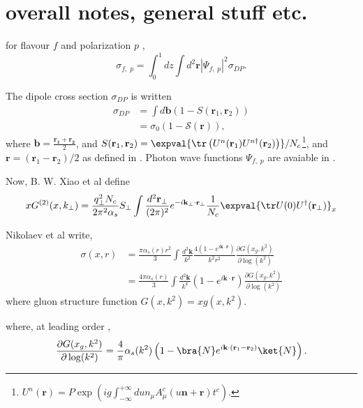 
\section{overall notes, general stuff etc.}

for flavour $f$ and polarization $p$ \cite{cambqcd}\cite{gbw1998},
\begin{equation}
	\sigma_{f,\;p}=\int_{0}^{1} d z \int d^2\mathbf{r}|\Psi_{f,\;p}|^2 \sigma_{DP}.
\end{equation}

The dipole cross section $\sigma_{DP}$ is written \cite{cambqcd}%
\begin{align}
	\sigma_{DP}&=\int d\mathbf{b}(1-S(\mathbf{r}_1,\mathbf{r}_2)) \\
	&=\sigma_0 (1-\mathcal{S}(\mathbf{r})),
\end{align}
where $\mathbf{b}=\frac{\mathbf{r_1}+\mathbf{r_2}}{2}$, and $S(\mathbf{r}_1,\mathbf{r}_2) =\expval{\tr\left( U^n(\mathbf{r}_1) U^{n\dagger}(\mathbf{r}_2)\right)}/N_c$\footnote{$U ^n (\mathbf{r})=P \exp\left(i g \int^{+\infty}_{-\infty}du n_\mu A^c_\mu (u \mathbf{n}+\mathbf{r}) t^c\right)$. %
}, and $ \mathbf{r}=(\mathbf{r}_1-\mathbf{r}_2)/2 $ as defined in \cite{cambqcd}.
\newline
Photon wave functions $\Psi_{f,\;p}$ are avaiable in \cite{gbw1998} \cite{nikolaev1994}.

Now, B. W. Xiao et al \cite{xiao2017} define
\begin{equation}
x G^{(2)}(x, k_\perp)=\frac{q_\perp^2 N_c}{2 \pi^2 \alpha_s} S_\perp \int \frac{d^2\mathbf{r}_\perp}{(2\pi)^2} e^{-i \mathbf{k}_\perp\cdot \mathbf{r}_\perp}\frac{1}{N_c}\expval{\tr U(0)U^\dagger(\mathbf{r}_\perp)}_x
\end{equation}

Nikolaev et al write\cite{nikolaev1994},
\begin{align}
\sigma(x,r)&=\frac{\pi \alpha_s(r) r^2}{3}\int\frac{d^2 \mathbf{k}}{k^2}\frac{4\left(1-e^{i\mathbf{k}\cdot\mathbf{r}}\right)}{k^2 r^2}\frac{\partial G(x_g,k^2)}{\partial \log(k^2)}\\
&=\frac{4 \pi \alpha_s(r) }{3}\int\frac{d^2 \mathbf{k}}{k^4}\left(1-e^{i\mathbf{k}\cdot\mathbf{r}}\right) \frac{\partial G(x_g,k^2)}{\partial \log(k^2)}
\label{eq:niktot}
\end{align}
where gluon structure function $G(x,k^2)=x g(x,k^2)$.


where, at leading order \cite{nikolaev1994},
\begin{equation}
\frac{\partial G(x_g,k^2)}{\partial \log(k^2)}=\frac{4}{\pi}\alpha_s(k^2) \left(1-\bra{N}e^{i\mathbf{k}\cdot (\mathbf{r}_1-\mathbf{r}_2)}\ket{N}\right).
\end{equation}



